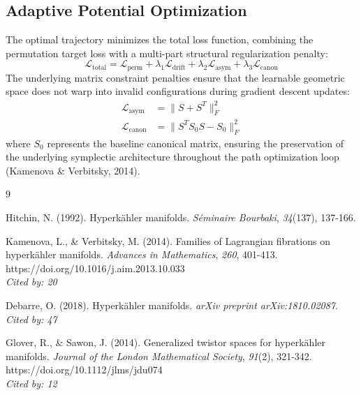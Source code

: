 \documentclass[11pt,a4paper]{article}
\begin{document}
\subsection{Adaptive Potential Optimization}
The optimal trajectory minimizes the total loss function, combining the permutation target loss with a multi-part structural regularization penalty:
\begin{equation}
\mathcal{L}_{\text{total}} = \mathcal{L}_{\text{perm}} + \lambda_1 \mathcal{L}_{\text{drift}} + \lambda_2 \mathcal{L}_{\text{asym}} + \lambda_3 \mathcal{L}_{\text{canon}}
\end{equation}
The underlying matrix constraint penalties ensure that the learnable geometric space does not warp into invalid configurations during gradient descent updates:
\begin{align}
\mathcal{L}_{\text{asym}} &= \|S + S^T\|^2_F \\
\mathcal{L}_{\text{canon}} &= \|S^T S_0 S - S_0\|^2_F
\end{align}
where $S_0$ represents the baseline canonical matrix, ensuring the preservation of the underlying symplectic architecture throughout the path optimization loop (Kamenova \& Verbitsky, 2014).

\newpage
\begin{thebibliography}{9}

Hitchin, N. (1992). Hyperk\"ahler manifolds. \textit{S\'eminaire Bourbaki}, \textit{34}(137), 137-166.

Kamenova, L., \& Verbitsky, M. (2014). Families of Lagrangian fibrations on hyperk\"ahler manifolds. \textit{Advances in Mathematics}, \textit{260}, 401-413. https://doi.org/10.1016/j.aim.2013.10.033
\\ \textit{Cited by: 20}

Debarre, O. (2018). Hyperk\"ahler manifolds. \textit{arXiv preprint arXiv:1810.02087}.
\\ \textit{Cited by: 47}

Glover, R., \& Sawon, J. (2014). Generalized twistor spaces for hyperk\"ahler manifolds. \textit{Journal of the London Mathematical Society}, \textit{91}(2), 321-342. https://doi.org/10.1112/jlms/jdu074
\\ \textit{Cited by: 12}

\end{thebibliography}
\end{document}

